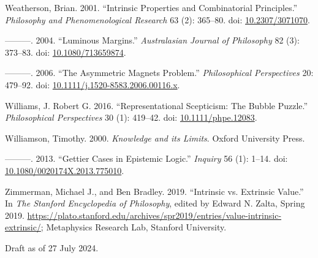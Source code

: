 \documentclass[
  11pt,
  letterpaper,
  DIV=11,
  numbers=noendperiod,
  twoside]{scrartcl}
\newlength{\cslhangindent}
\newenvironment{CSLReferences}[2] %
 {\begin{list}{}{%
  \setlength{\itemindent}{0pt}
  \setlength{\leftmargin}{0pt}
  \setlength{\parsep}{0pt}
  \ifodd #1
   \setlength{\leftmargin}{\cslhangindent}
   \setlength{\itemindent}{-1\cslhangindent}
  \fi
  \setlength{\itemsep}{#2\baselineskip}}}
 {\end{list}}
\begin{document}
\begin{CSLReferences}{1}{0}
Weatherson, Brian. 2001. {``{Intrinsic Properties and Combinatorial
Principles}.''} \emph{Philosophy and Phenomenological Research} 63 (2):
365--80. doi: \href{https://doi.org/10.2307/3071070}{10.2307/3071070}.

---------. 2004. {``Luminous Margins.''} \emph{Australasian Journal of
Philosophy} 82 (3): 373--83. doi:
\href{https://doi.org/10.1080/713659874}{10.1080/713659874}.

---------. 2006. {``{The Asymmetric Magnets Problem}.''}
\emph{Philosophical Perspectives} 20: 479--92. doi:
\href{https://doi.org/10.1111/j.1520-8583.2006.00116.x}{10.1111/j.1520-8583.2006.00116.x}.

Williams, J. Robert G. 2016. {``Representational Scepticism: The Bubble
Puzzle.''} \emph{Philosophical Perspectives} 30 (1): 419--42. doi:
\href{https://doi.org/10.1111/phpe.12083}{10.1111/phpe.12083}.

Williamson, Timothy. 2000. \emph{{Knowledge and its Limits}}. Oxford
University Press.

---------. 2013. {``Gettier Cases in Epistemic Logic.''} \emph{Inquiry}
56 (1): 1--14. doi:
\href{https://doi.org/10.1080/0020174X.2013.775010}{10.1080/0020174X.2013.775010}.

Zimmerman, Michael J., and Ben Bradley. 2019. {``{Intrinsic vs.
Extrinsic Value}.''} In \emph{The {Stanford} Encyclopedia of
Philosophy}, edited by Edward N. Zalta, {S}pring 2019.
\url{https://plato.stanford.edu/archives/spr2019/entries/value-intrinsic-extrinsic/};
Metaphysics Research Lab, Stanford University.

\end{CSLReferences}



\noindent Draft as of 27 July 2024.
\end{document}
